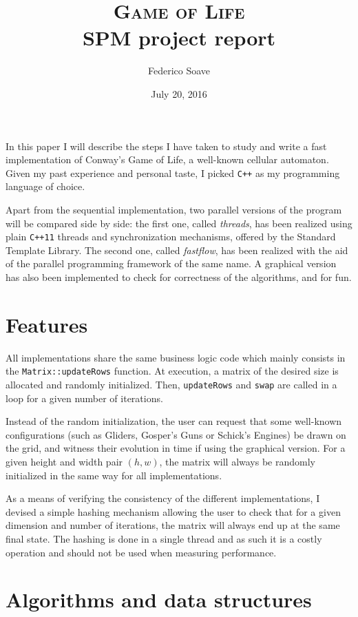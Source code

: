 \documentclass[a4paper,11pt]{article}
\newcommand{\code}[1]{\texttt{#1}}
\begin{document}
\author{Federico Soave}
\date{July 20, 2016}
\title{{\huge\scshape Game of Life} \\ {\large SPM project report}}
\maketitle

In this paper I will describe the steps I have taken to study and write a fast implementation of Conway's Game of Life, a well-known cellular automaton. Given my past experience and personal taste, I picked \code{C++} as my programming language of choice.

Apart from the sequential implementation, two parallel versions of the program will be compared side by side: the first one, called \emph{threads}, has been realized using plain \code{C++11} threads and synchronization mechanisms, offered by the Standard Template Library. The second one, called \emph{fastflow}, has been realized with the aid of the parallel programming framework of the same name. A graphical version has also been implemented to check for correctness of the algorithms, and for fun.

\section{Features}

All implementations share the same business logic code which mainly consists in the \code{Matrix::updateRows} function. At execution, a matrix of the desired size is allocated and randomly initialized. Then, \code{updateRows} and \code{swap} are called in a loop for a given number of iterations.

Instead of the random initialization, the user can request that some well-known configurations (such as Gliders, Gosper's Guns or Schick's Engines) be drawn on the grid, and witness their evolution in time if using the graphical version. For a given height and width pair $(h,w)$, the matrix will always be randomly initialized in the same way for all implementations.

As a means of verifying the consistency of the different implementations, I devised a simple hashing mechanism allowing the user to check that for a given dimension and number of iterations, the matrix will always end up at the same final state. The hashing is done in a single thread and as such it is a costly operation and should not be used when measuring performance.

\section{Algorithms and data structures}
\end{document}
